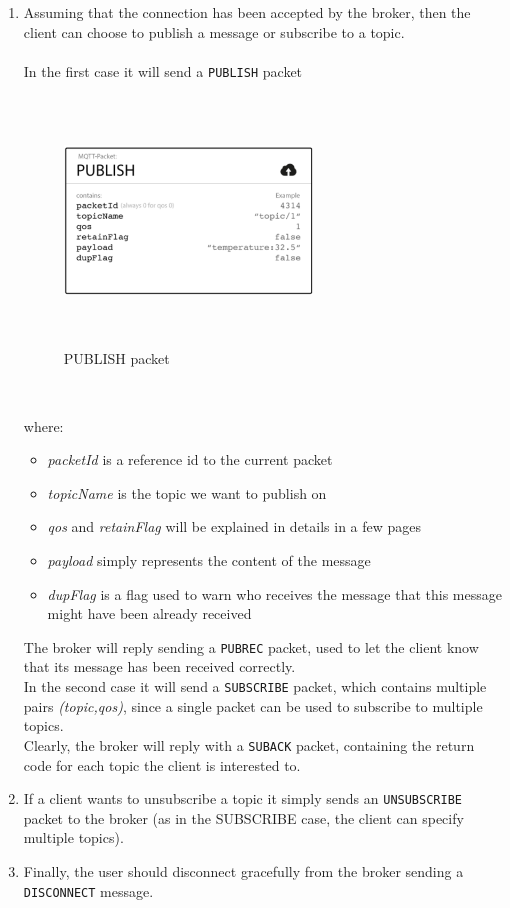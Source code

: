 \documentclass[12pt]{report}
\begin{document}
\begin{enumerate}
\item Assuming that the connection has been accepted by the broker, then the client can choose to publish a message or subscribe to a topic.\\\\
In the first case it will send a \texttt{PUBLISH} packet

\begin{figure}[H]
\includegraphics[width=6.6cm,height=6.6cm,keepaspectratio]{publish_message}
\centering
\caption{PUBLISH packet}
\end{figure}\

where:

\begin{itemize}
\setlength{\itemindent}{+4mm}
\item \emph{packetId} is a reference id to the current packet
\item \emph{topicName} is the topic we want to publish on
\item \emph{qos} and \emph{retainFlag} will be explained in details in a few pages
\item \emph{payload} simply represents the content of the message
\item \emph{dupFlag} is a flag used to warn who receives the message that this message might have been already received
\end{itemize}

The broker will reply sending a \texttt{PUBREC} packet, used to let the client know that its message has been received correctly.
\bigskip \\
In the second case it will send a \texttt{SUBSCRIBE} packet, which contains multiple pairs \emph{(topic,qos)}, since a single packet can be used to subscribe to multiple topics.\\
Clearly, the broker will reply with a \texttt{SUBACK} packet, containing the return code for each topic the client is interested to.

\item If a client wants to unsubscribe a topic it simply sends an \texttt{UNSUBSCRIBE}  packet to the broker (as in the SUBSCRIBE case, the client can specify multiple topics).

\item Finally, the user should disconnect gracefully from the broker sending a \texttt{DISCONNECT} message.\\\\\\

\end{enumerate}
\bigskip
\end{document}

